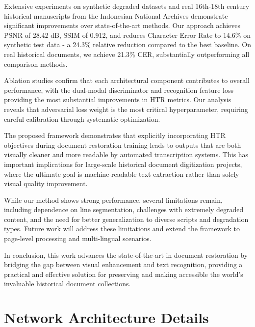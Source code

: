 \documentclass[journal]{IEEEtran}
\begin{document}
Extensive experiments on synthetic degraded datasets and real 16th-18th century historical manuscripts from the Indonesian National Archives demonstrate significant improvements over state-of-the-art methods. Our approach achieves PSNR of 28.42 dB, SSIM of 0.912, and reduces Character Error Rate to 14.6\% on synthetic test data - a 24.3\% relative reduction compared to the best baseline. On real historical documents, we achieve 21.3\% CER, substantially outperforming all comparison methods.

Ablation studies confirm that each architectural component contributes to overall performance, with the dual-modal discriminator and recognition feature loss providing the most substantial improvements in HTR metrics. Our analysis reveals that adversarial loss weight is the most critical hyperparameter, requiring careful calibration through systematic optimization.

The proposed framework demonstrates that explicitly incorporating HTR objectives during document restoration training leads to outputs that are both visually cleaner and more readable by automated transcription systems. This has important implications for large-scale historical document digitization projects, where the ultimate goal is machine-readable text extraction rather than solely visual quality improvement.

While our method shows strong performance, several limitations remain, including dependence on line segmentation, challenges with extremely degraded content, and the need for better generalization to diverse scripts and degradation types. Future work will address these limitations and extend the framework to page-level processing and multi-lingual scenarios.

In conclusion, this work advances the state-of-the-art in document restoration by bridging the gap between visual enhancement and text recognition, providing a practical and effective solution for preserving and making accessible the world's invaluable historical document collections.

\appendices

\section{Network Architecture Details}

\end{document}
